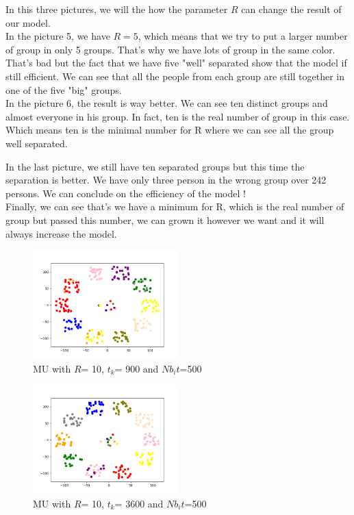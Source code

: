 \documentclass{article}
\begin{document}
In this three pictures, we will the how the parameter $R$ can change the result of our model.\\

In the picture 5, we have $R=5$, which means that we try to put a larger number of group in only 5 groups. That's why we have lots of group in the same color. That's bad but the fact that we have five "well" separated show that the model if still efficient. We can see that all the people from each group are still together in one of the five "big" groups.\\

In the picture 6, the result is way better. We can see ten distinct groups and almost everyone in his group. In fact, ten is the real number of group in this case. Which means ten is the minimal number for R where we can see all the group well separated.

In the last picture, we still have ten separated groups but this time the separation is better. We have only three person in the wrong group over 242 persons. We can conclude on the efficiency of the model !\\

Finally, we can see that's we have a minimum for R, which is the real number of group but passed this number, we can grown it however we want and it will always increase the model.

\begin{figure}[h]
    \centering
    \includegraphics[width=0.5\textwidth]{images/MU500_R10_t900.png}
    \caption{MU with $R$= 10, $t_{k}$= 900 and $Nb_it$=500}

\end{figure}

\begin{figure}[h]
    \centering
    \includegraphics[width=0.5\textwidth]{images/MU500_R10_t3600.png}
    \caption{MU with $R$= 10, $t_{k}$= 3600 and $Nb_it$=500}

\end{figure}
\end{document}
